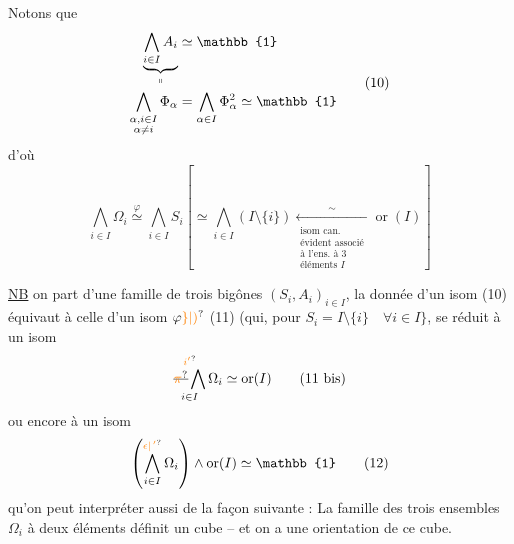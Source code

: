 Notons que
\[
\begin{aligned}
 \underbrace{\bigwedge_{i\in I} A_i}_{\shortparallel}&\simeq\mathbb{1}\\
 \bigwedge_{\substack{\alpha,i\in I\\\alpha\ne i}}\Phi_\alpha
 &=\bigwedge_{\alpha\in I}\Phi_\alpha^2\simeq\mathbb{1}
\end{aligned}\tag*{(10)}
\]
d'où
\[
 \bigwedge_{i\in I}\Omega_i\overset{\varphi}{\simeq}
 \bigwedge_{i\in I}S_i
 \left[\simeq\bigwedge_{i\in I}(I\setminus\{i\})
 \underset{\substack{\text{isom can.}\\\text{évident associé}\\\text{à l'ens. à 3}\\\text{éléments }I}}{\overset{\sim}{\leftarrow}}
 \operatorname{or}(I)\right]\tag*{(11)}
\]

\uline{NB}  on part d'une famille  de trois bigônes $(S_i,A_i)_{i\in I}$, la donnée d'un isom (10) équivaut à celle d'un isom $\varphi\unsure{\}|)}$ (11) (qui, pour $S_i=I\setminus\{i\}\quad\forall i\in I\}$, se réduit à un isom
\[
 \mathop{\deleted{\unsure{\pi}}\bigwedge}\limits_{i\in I}^{\unsure{i'}}\Omega_i\simeq\operatorname{or}(I)\tag*{(11 bis)}
\]
ou encore à un isom
\[
 \left(\bigwedge_{i\in I}^{\unsure{\epsilon|{\,}'}}\Omega_i\right)\wedge\operatorname{or}(I)\simeq\mathbb{1}\tag*{(12)}
\]
qu'on peut interpréter aussi de la façon suivante : La famille  des trois ensembles $\Omega_i$ à deux éléments définit un cube -- et on a une orientation de ce cube.

